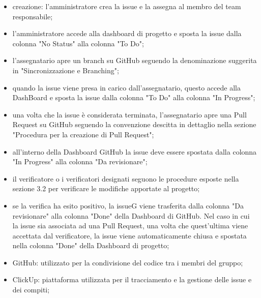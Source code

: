 \begin{itemize}
    \item creazione: l’amministratore crea la issue e la assegna al membro del team responsabile;
    \item l’amministratore accede alla dashboard di progetto e sposta la issue dalla colonna "No Status" alla colonna "To Do";
    \item l’assegnatario apre un branch su GitHub seguendo la denominazione suggerita in "Sincronizzazione e Branching";
    \item quando la issue viene presa in carico dall’assegnatario, questo accede alla DashBoard e sposta la issue dalla colonna "To Do" alla colonna "In Progress";
    \item una volta che la issue è considerata terminata, l’assegnatario apre una Pull Request su GitHub seguendo la convenzione descitta in dettaglio nella sezione "Procedura per la creazione di Pull Request";
    \item all’interno della Dashboard GitHub la issue deve essere spostata dalla colonna "In Progress" alla colonna "Da revisionare";
    \item il verificatore o i verificatori designati seguono le procedure esposte nella sezione 3.2 per verificare le modifiche apportate al progetto;
    \item se la verifica ha esito positivo, la issueG viene trasferita dalla colonna "Da revisionare" alla colonna "Done" della Dashboard di GitHub. Nel caso in cui la issue sia associata ad una Pull Request, una volta che quest’ultima viene accettata dal verificatore, la issue viene automaticamente chiusa e spostata nella colonna "Done" della Dashboard di progetto;
\end{itemize}
\begin{itemize}
    \item GitHub: utilizzato per la condivisione del codice tra i membri del gruppo;
    \item ClickUp: piattaforma utilizzata per il tracciamento e la gestione delle issue e dei compiti;
\end{itemize}
